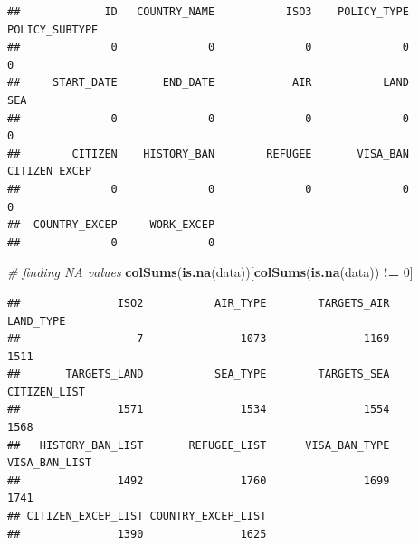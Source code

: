 \documentclass[]{article}
\newenvironment{Shaded}{\begin{snugshade}}{\end{snugshade}}
\newcommand{\CommentTok}[1]{\textcolor[rgb]{0.56,0.35,0.01}{\textit{#1}}}
\newcommand{\ControlFlowTok}[1]{\textcolor[rgb]{0.13,0.29,0.53}{\textbf{#1}}}
\newcommand{\DecValTok}[1]{\textcolor[rgb]{0.00,0.00,0.81}{#1}}
\newcommand{\KeywordTok}[1]{\textcolor[rgb]{0.13,0.29,0.53}{\textbf{#1}}}
\newcommand{\NormalTok}[1]{#1}
\newcommand{\OperatorTok}[1]{\textcolor[rgb]{0.81,0.36,0.00}{\textbf{#1}}}
\newcommand{\StringTok}[1]{\textcolor[rgb]{0.31,0.60,0.02}{#1}}
\begin{document}
\begin{verbatim}
##             ID   COUNTRY_NAME           ISO3    POLICY_TYPE POLICY_SUBTYPE 
##              0              0              0              0              0 
##     START_DATE       END_DATE            AIR           LAND            SEA 
##              0              0              0              0              0 
##        CITIZEN    HISTORY_BAN        REFUGEE       VISA_BAN  CITIZEN_EXCEP 
##              0              0              0              0              0 
##  COUNTRY_EXCEP     WORK_EXCEP 
##              0              0
\end{verbatim}

\begin{Shaded}
\begin{Highlighting}[]
\CommentTok{# finding NA values}
\KeywordTok{colSums}\NormalTok{(}\KeywordTok{is.na}\NormalTok{(data))[}\KeywordTok{colSums}\NormalTok{(}\KeywordTok{is.na}\NormalTok{(data)) }\OperatorTok{!=}\StringTok{ }\DecValTok{0}\NormalTok{]}
\end{Highlighting}
\end{Shaded}

\begin{verbatim}
##               ISO2           AIR_TYPE        TARGETS_AIR          LAND_TYPE 
##                  7               1073               1169               1511 
##       TARGETS_LAND           SEA_TYPE        TARGETS_SEA       CITIZEN_LIST 
##               1571               1534               1554               1568 
##   HISTORY_BAN_LIST       REFUGEE_LIST      VISA_BAN_TYPE      VISA_BAN_LIST 
##               1492               1760               1699               1741 
## CITIZEN_EXCEP_LIST COUNTRY_EXCEP_LIST 
##               1390               1625
\end{verbatim}

\begin{Shaded}
\end{Shaded}
\end{document}
